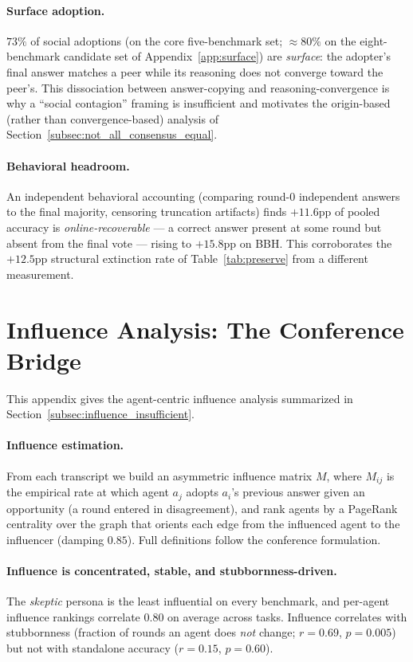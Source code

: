 \paragraph{Surface adoption.}
$73\%$ of social adoptions (on the core five-benchmark set; $\approx 80\%$ on the eight-benchmark candidate
set of Appendix~\ref{app:surface}) are \emph{surface}: the adopter's final answer matches a peer while its reasoning
does not converge toward the peer's. This dissociation between answer-copying and reasoning-convergence is
why a ``social contagion'' framing is insufficient and motivates the origin-based (rather than
convergence-based) analysis of Section~\ref{subsec:not_all_consensus_equal}.

\paragraph{Behavioral headroom.}
An independent behavioral accounting (comparing round-0 independent answers to the final majority, censoring
truncation artifacts) finds $+11.6$pp of pooled accuracy is \emph{online-recoverable} --- a correct answer
present at some round but absent from the final vote --- rising to $+15.8$pp on BBH. This corroborates the
$+12.5$pp structural extinction rate of Table~\ref{tab:preserve} from a different measurement.

\section{Influence Analysis: The Conference Bridge}
\label{app:influence}

This appendix gives the agent-centric influence analysis summarized in Section~\ref{subsec:influence_insufficient}.

\paragraph{Influence estimation.}
From each transcript we build an asymmetric influence matrix $M$, where $M_{ij}$ is the empirical rate at
which agent $a_j$ adopts $a_i$'s previous answer given an opportunity (a round entered in disagreement),
and rank agents by a PageRank centrality over the graph that orients each edge from the influenced agent to
the influencer (damping $0.85$). Full definitions follow the conference formulation.

\paragraph{Influence is concentrated, stable, and stubbornness-driven.}
The \emph{skeptic} persona is the least influential on every benchmark, and per-agent influence rankings
correlate $0.80$ on average across tasks. Influence correlates with stubbornness (fraction of rounds an
agent does \emph{not} change; $r=0.69$, $p=0.005$) but not with standalone accuracy ($r=0.15$, $p=0.60$).

